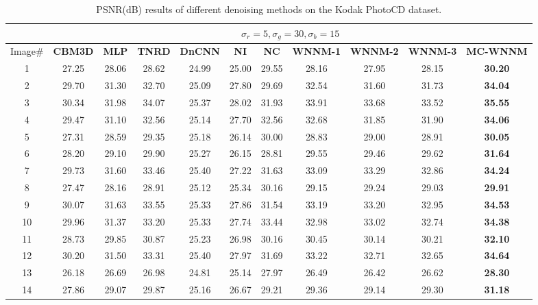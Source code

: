 \vspace{5mm}
\begin{table}[!htbp]
\caption{PSNR(dB) results of different denoising methods on the Kodak PhotoCD dataset.}
\label{t3}
\begin{center}
\renewcommand\arraystretch{1.0}
\scriptsize
\begin{tabular}{|c||c|c|c|c|c|c|c|c|c|c|}
\hline
&\multicolumn{10}{c|}{ $\sigma_{r} = 5, \sigma_{g} = 30, \sigma_{b} = 15$}
\\
\hline
\hline
Image\#
&
\textbf{CBM3D}
&
\textbf{MLP}
&
\textbf{TNRD}
&
\textbf{DnCNN}
&
\textbf{NI}
&
\textbf{NC}
&
\textbf{WNNM-1}
&
\textbf{WNNM-2}
&
\textbf{WNNM-3}
&
\textbf{MC-WNNM}
\\
\hline
1& 27.25 & 28.06 & 28.62 & 24.99 & 25.00 & 29.55 & 28.16 & 27.95 & 28.15 & \textbf{30.20}
\\
\hline
2& 29.70 & 31.30 & 32.70 & 25.09 & 27.80 & 29.69 & 32.54 & 31.60 & 31.73 & \textbf{34.04}
\\
\hline
3& 30.34 & 31.98 & 34.07 & 25.37 & 28.02 & 31.93 & 33.91 & 33.68 & 33.52 & \textbf{35.55}
\\
\hline 
4& 29.47 & 31.10 & 32.56 & 25.14 & 27.70 & 32.56 & 32.68 & 31.85 & 31.90 & \textbf{34.06} 
\\
\hline
5& 27.31 & 28.59 & 29.35 & 25.18 & 26.14 & 30.00 & 28.83 & 29.00 & 28.91 & \textbf{30.05}
\\
\hline
6& 28.20 & 29.10 & 29.90 & 25.27 & 26.15 & 28.81 & 29.55 & 29.46 & 29.62 & \textbf{31.64}
\\
\hline
7& 29.73 & 31.60 & 33.46 & 25.40 & 27.22 & 31.63 & 33.09 & 33.29 & 32.86 & \textbf{34.24} 
\\
\hline
8& 27.47 & 28.16 & 28.91 & 25.12 & 25.34 & 30.16 & 29.15 & 29.24 & 29.03 & \textbf{29.91}
\\
\hline
9& 30.07 & 31.63 & 33.55 & 25.33 & 27.86 & 31.54 & 33.19 & 33.20 & 32.95 & \textbf{34.53}
\\
\hline
10& 29.96 & 31.37 & 33.20 & 25.33 & 27.74 & 33.44 & 32.98 & 33.02 & 32.74 & \textbf{34.38}
\\
\hline
11& 28.73 & 29.85 & 30.87 & 25.23 & 26.98 & 30.16 & 30.45 & 30.14 & 30.21 & \textbf{32.10}
\\
\hline
12& 30.20 & 31.50 & 33.31 & 25.40 & 27.97 & 31.69 & 33.22 & 32.71 & 32.65 & \textbf{34.64}
\\
\hline
13& 26.18 & 26.69 & 26.98 & 24.81 & 25.14 & 27.97 & 26.49 & 26.42 & 26.62 & \textbf{28.30}
\\
\hline
14& 27.86 & 29.07 & 29.87 & 25.16 & 26.67 & 29.21 & 29.36 & 29.14 & 29.30 & \textbf{31.18}

\end{tabular}
\end{center}
\end{table}
